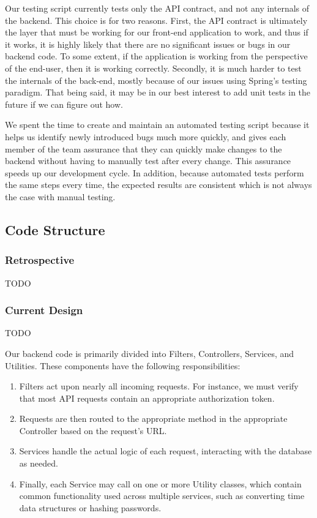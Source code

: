 \documentclass[12pt]{article}
\begin{document}
Our testing script currently tests only the API contract, and not any internals of the backend. This choice is for two reasons. First, the API contract is ultimately the layer that must be working for our front-end application to work, and thus if it works, it is highly likely that there are no significant issues or bugs in our backend code. To some extent, if the application is working from the perspective of the end-user, then it is working correctly. Secondly, it is much harder to test the internals of the back-end, mostly because of our issues using Spring's testing paradigm. That being said, it may be in our best interest to add unit tests in the future if we can figure out how. 

We spent the time to create and maintain an automated testing script because it helps us identify newly introduced bugs much more quickly, and gives each member of the team assurance that they can quickly make changes to the backend without having to manually test after every change. This assurance speeds up our development cycle. In addition, because automated tests perform the same steps every time, the expected results are consistent which is not always the case with manual testing.

\subsection{Code Structure}
\subsubsection{Retrospective}
TODO
\subsubsection{Current Design}
TODO

Our backend code is primarily divided into Filters, Controllers, Services, and Utilities. These components have the following responsibilities: 
\begin{enumerate}
    \item Filters act upon nearly all incoming requests. For instance, we must verify that most API requests contain an appropriate authorization token. 
    \item Requests are then routed to the appropriate method in the appropriate Controller based on the request's URL.
    \item Services handle the actual logic of each request, interacting with the database as needed. 
    \item Finally, each Service may call on one or more Utility classes, which contain common functionality used across multiple services, such as converting time data structures or hashing passwords. 
\end{enumerate}
\end{document}

